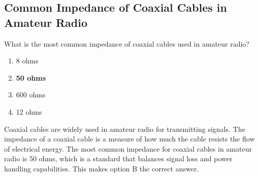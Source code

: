 \subsection{Common Impedance of Coaxial Cables in Amateur Radio}
\label{T9B02}

\begin{tcolorbox}[colback=gray!10!white,colframe=black!75!black,title=T9B02]
What is the most common impedance of coaxial cables used in amateur radio?
\begin{enumerate}[noitemsep]
    \item 8 ohms
    \item \textbf{50 ohms}
    \item 600 ohms
    \item 12 ohms
\end{enumerate}
\end{tcolorbox}

Coaxial cables are widely used in amateur radio for transmitting signals. The impedance of a coaxial cable is a measure of how much the cable resists the flow of electrical energy. The most common impedance for coaxial cables in amateur radio is 50 ohms, which is a standard that balances signal loss and power handling capabilities. This makes option B the correct answer.
